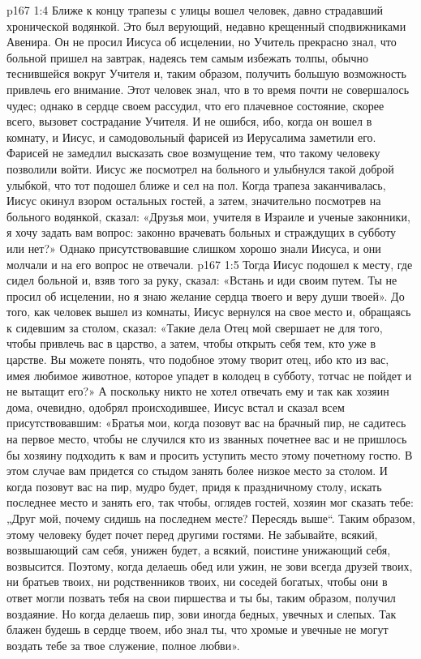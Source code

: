 \vs p167 1:4 Ближе к концу трапезы с улицы вошел человек, давно страдавший хронической водянкой. Это был верующий, недавно крещенный сподвижниками Авенира. Он не просил Иисуса об исцелении, но Учитель прекрасно знал, что больной пришел на завтрак, надеясь тем самым избежать толпы, обычно теснившейся вокруг Учителя и, таким образом, получить большую возможность привлечь его внимание. Этот человек знал, что в то время почти не совершалось чудес; однако в сердце своем рассудил, что его плачевное состояние, скорее всего, вызовет сострадание Учителя. И не ошибся, ибо, когда он вошел в комнату, и Иисус, и самодовольный фарисей из Иерусалима заметили его. Фарисей не замедлил высказать свое возмущение тем, что такому человеку позволили войти. Иисус же посмотрел на больного и улыбнулся такой доброй улыбкой, что тот подошел ближе и сел на пол. Когда трапеза заканчивалась, Иисус окинул взором остальных гостей, а затем, значительно посмотрев на больного водянкой, сказал: «Друзья мои, учителя в Израиле и ученые законники, я хочу задать вам вопрос: законно врачевать больных и страждущих в субботу или нет?» Однако присутствовавшие слишком хорошо знали Иисуса, и они молчали и на его вопрос не отвечали.
\vs p167 1:5 \pc Тогда Иисус подошел к месту, где сидел больной и, взяв того за руку, сказал: «Встань и иди своим путем. Ты не просил об исцелении, но я знаю желание сердца твоего и веру души твоей». До того, как человек вышел из комнаты, Иисус вернулся на свое место и, обращаясь к сидевшим за столом, сказал: «Такие дела Отец мой свершает не для того, чтобы привлечь вас в царство, а затем, чтобы открыть себя тем, кто уже в царстве. Вы можете понять, что подобное этому творит отец, ибо кто из вас, имея любимое животное, которое упадет в колодец в субботу, тотчас не пойдет и не вытащит его?» А поскольку никто не хотел отвечать ему и так как хозяин дома, очевидно, одобрял происходившее, Иисус встал и сказал всем присутствовавшим: «Братья мои, когда позовут вас на брачный пир, не садитесь на первое место, чтобы не случился кто из званных почетнее вас и не пришлось бы хозяину подходить к вам и просить уступить место этому почетному гостю. В этом случае вам придется со стыдом занять более низкое место за столом. И когда позовут вас на пир, мудро будет, придя к праздничному столу, искать последнее место и занять его, так чтобы, оглядев гостей, хозяин мог сказать тебе: „Друг мой, почему сидишь на последнем месте? Пересядь выше“. Таким образом, этому человеку будет почет перед другими гостями. Не забывайте, всякий, возвышающий сам себя, унижен будет, а всякий, поистине унижающий себя, возвысится. Поэтому, когда делаешь обед или ужин, не зови всегда друзей твоих, ни братьев твоих, ни родственников твоих, ни соседей богатых, чтобы они в ответ могли позвать тебя на свои пиршества и ты бы, таким образом, получил воздаяние. Но когда делаешь пир, зови иногда бедных, увечных и слепых. Так блажен будешь в сердце твоем, ибо знал ты, что хромые и увечные не могут воздать тебе за твое служение, полное любви».

